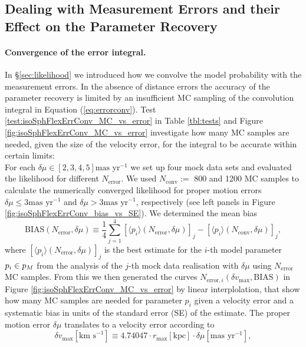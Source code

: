 \subsection{Dealing with Measurement Errors and their Effect on the Parameter Recovery} \label{sec:results_errors}

\paragraph{Convergence of the error integral.} In \S \ref{sec:likelihood} we introduced how we convolve the model probability with the measurement errors. In the absence of distance errors the accuracy of the parameter recovery is limited by an insufficient MC sampling of the convolution integral in Equation (\ref{eq:errorconv}). Test \ref{test:isoSphFlexErrConv_MC_vs_error} in Table \ref{tbl:tests} and Figure \ref{fig:isoSphFlexErrConv_MC_vs_error} investigate how many MC samples are needed, given the size of the velocity error, for the integral to be accurate within certain limits:
\\For each $\delta \mu \in [2,3,4,5] \text{mas yr}^{-1}$ we set up four mock data sets and evaluated the likelihood for different $N_\text{error}$. We used $N_\text{conv} :=$ 800 and 1200 MC samples to calculate the numerically converged likelihood for proper motion errors $\delta \mu \leq 3 \text{mas yr}^{-1}$ and $\delta \mu > 3 \text{mas yr}^{-1}$, respectively (see left panels in Figure \ref{fig:isoSphFlexErrConv_bias_vs_SE}). We determined the mean bias 
\begin{equation*}
\text{BIAS}(N_\text{error},\delta \mu) \equiv \frac{1}{4} \sum_{j=1}^4 \left[ \langle p_i \rangle (N_\text{error},\delta \mu)\right]_j - \left[ \langle p_i \rangle (N_\text{conv},\delta \mu)\right]_j,
\end{equation*}
where $\left[ \langle p_i \rangle (N_\text{error},\delta \mu)\right]_j$ is the best estimate for the $i$-th model parameter $p_i \in p_M$ from the analysis of the $j$-th mock data realisation with $\delta \mu$ using $N_\text{error}$ MC samples. From this we then generated the curves $N_{\text{error},i} (\delta v_\text{max},\text{BIAS})$ in Figure \ref{fig:isoSphFlexErrConv_MC_vs_error} by linear interplolation, that show how many MC samples are needed for parameter $p_i$ given a velocity error and a systematic bias in units of the standard error (SE) of the estimate. The proper motion error $\delta \mu$ translates to a velocity error according to 
\begin{equation}
\delta v_\text{max} [\text{km s}^{-1}] \equiv 4.74047 \cdot r_\text{max}[\text{kpc}] \cdot \delta \mu [\text{mas yr}^{-1}], \label{eq:vmax}
\end{equation}
